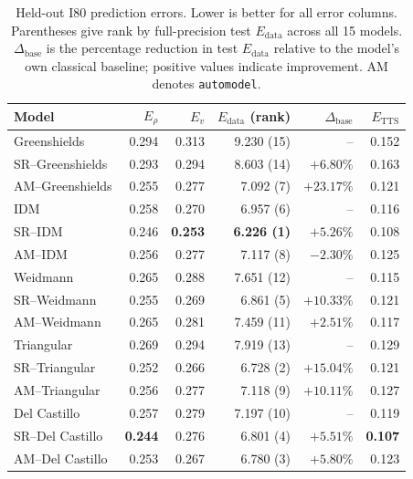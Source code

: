 \begin{table}[t]
    \centering
    \small
    \setlength{\tabcolsep}{3.5pt}
    \caption{Held-out I80 prediction errors. Lower is better for all error
    columns. Parentheses give rank by full-precision test
    $E_{\mathrm{data}}$ across all 15 models. $\Delta_{\mathrm{base}}$ is the
    percentage reduction in test $E_{\mathrm{data}}$ relative to the model's
    own classical baseline; positive values indicate improvement. AM denotes
    \texttt{automodel}.}
    \label{tab:traffic-test-results}
    \begin{tabular}{@{}lrrrrr@{}}
        \toprule
        Model & $E_\rho$ & $E_v$ & $E_{\mathrm{data}}$ (rank)
              & $\Delta_{\mathrm{base}}$ & $E_{\mathrm{TTS}}$ \\
        \midrule
        Greenshields       & 0.294 & 0.313 & 9.230 (15) & --       & 0.152 \\
        SR--Greenshields   & 0.293 & 0.294 & 8.603 (14) & $+6.80\%$  & 0.163 \\
        AM--Greenshields   & 0.255 & 0.277 & 7.092 (7)  & $+23.17\%$ & 0.121 \\
        IDM                & 0.258 & 0.270 & 6.957 (6)  & --       & 0.116 \\
        SR--IDM            & 0.246 & \textbf{0.253} & \textbf{6.226 (1)}
                           & $+5.26\%$ & 0.108 \\
        AM--IDM            & 0.256 & 0.277 & 7.117 (8)  & $-2.30\%$ & 0.125 \\
        Weidmann           & 0.265 & 0.288 & 7.651 (12) & --       & 0.115 \\
        SR--Weidmann       & 0.255 & 0.269 & 6.861 (5)  & $+10.33\%$ & 0.121 \\
        AM--Weidmann       & 0.265 & 0.281 & 7.459 (11) & $+2.51\%$ & 0.117 \\
        Triangular         & 0.269 & 0.294 & 7.919 (13) & --       & 0.129 \\
        SR--Triangular     & 0.252 & 0.266 & 6.728 (2)  & $+15.04\%$ & 0.121 \\
        AM--Triangular     & 0.256 & 0.277 & 7.118 (9)  & $+10.11\%$ & 0.127 \\
        Del Castillo       & 0.257 & 0.279 & 7.197 (10) & --       & 0.119 \\
        SR--Del Castillo   & \textbf{0.244} & 0.276 & 6.801 (4)
                           & $+5.51\%$ & \textbf{0.107} \\
        AM--Del Castillo   & 0.253 & 0.267 & 6.780 (3)  & $+5.80\%$ & 0.123 \\
        \bottomrule
    \end{tabular}
\end{table}

